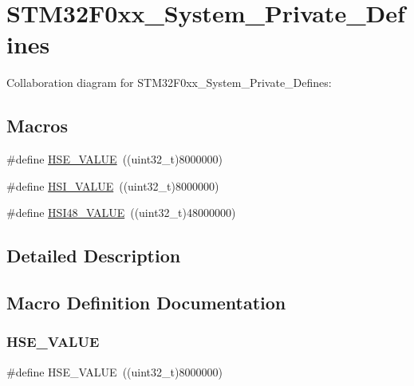 \hypertarget{group___s_t_m32_f0xx___system___private___defines}{}\section{S\+T\+M32\+F0xx\+\_\+\+System\+\_\+\+Private\+\_\+\+Defines}
\label{group___s_t_m32_f0xx___system___private___defines}
Collaboration diagram for S\+T\+M32\+F0xx\+\_\+\+System\+\_\+\+Private\+\_\+\+Defines\+:
\subsection*{Macros}
\begin{DoxyCompactItemize}
\item 
\#define \hyperlink{group___s_t_m32_f0xx___system___private___defines_gaeafcff4f57440c60e64812dddd13e7cb}{H\+S\+E\+\_\+\+V\+A\+L\+UE}~((uint32\+\_\+t)8000000)
\item 
\#define \hyperlink{group___s_t_m32_f0xx___system___private___defines_gaaa8c76e274d0f6dd2cefb5d0b17fbc37}{H\+S\+I\+\_\+\+V\+A\+L\+UE}~((uint32\+\_\+t)8000000)
\item 
\#define \hyperlink{group___s_t_m32_f0xx___system___private___defines_ga47f01e5e3f2edfa94bf74c08835f3875}{H\+S\+I48\+\_\+\+V\+A\+L\+UE}~((uint32\+\_\+t)48000000)
\end{DoxyCompactItemize}


\subsection{Detailed Description}


\subsection{Macro Definition Documentation}
\mbox{\label{group___s_t_m32_f0xx___system___private___defines_gaeafcff4f57440c60e64812dddd13e7cb}} 
\subsubsection{\texorpdfstring{H\+S\+E\+\_\+\+V\+A\+L\+UE}{HSE\_VALUE}}
{\footnotesize\ttfamily \#define H\+S\+E\+\_\+\+V\+A\+L\+UE~((uint32\+\_\+t)8000000)}

